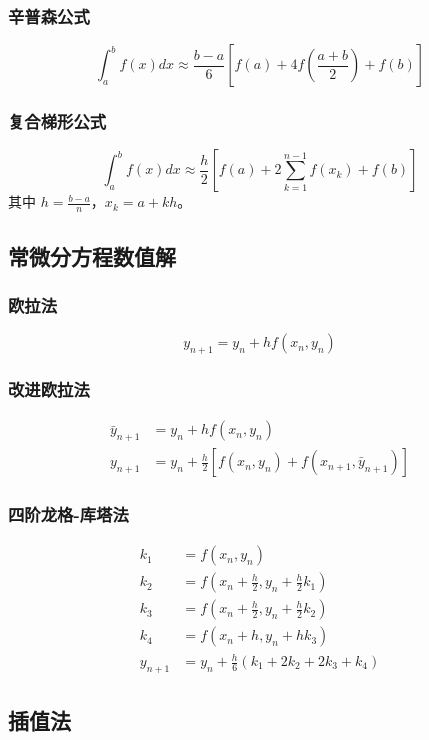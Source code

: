 \documentclass[12pt]{article}
\begin{document}
\subsubsection{辛普森公式}
$$\int_a^b f(x) dx \approx \frac{b-a}{6}\left[f(a) + 4f\left(\frac{a+b}{2}\right) + f(b)\right]$$

\subsubsection{复合梯形公式}
$$\int_a^b f(x) dx \approx \frac{h}{2}\left[f(a) + 2\sum_{k=1}^{n-1}f(x_k) + f(b)\right]$$
其中 $h = \frac{b-a}{n}$，$x_k = a + kh$。

\subsection{常微分方程数值解}

\subsubsection{欧拉法}
$$y_{n+1} = y_n + hf(x_n, y_n)$$

\subsubsection{改进欧拉法}
\begin{align}
\bar{y}_{n+1} &= y_n + hf(x_n, y_n) \\
y_{n+1} &= y_n + \frac{h}{2}[f(x_n, y_n) + f(x_{n+1}, \bar{y}_{n+1})]
\end{align}

\subsubsection{四阶龙格-库塔法}
\begin{align}
k_1 &= f(x_n, y_n) \\
k_2 &= f\left(x_n + \frac{h}{2}, y_n + \frac{h}{2}k_1\right) \\
k_3 &= f\left(x_n + \frac{h}{2}, y_n + \frac{h}{2}k_2\right) \\
k_4 &= f(x_n + h, y_n + hk_3) \\
y_{n+1} &= y_n + \frac{h}{6}(k_1 + 2k_2 + 2k_3 + k_4)
\end{align}

\subsection{插值法}
\end{document}

